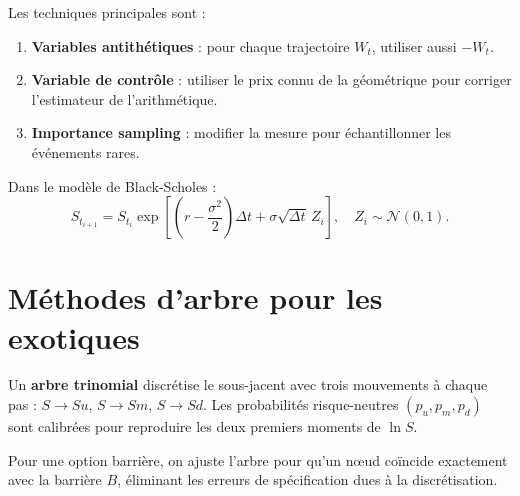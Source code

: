 \begin{proposition}
Les techniques principales sont :
\begin{enumerate}
    \item \textbf{Variables antith\'etiques} : pour chaque trajectoire
    $W_t$, utiliser aussi $-W_t$.
    \item \textbf{Variable de contr\^ole} : utiliser le prix connu de la
    g\'eom\'etrique pour corriger l'estimateur de l'arithm\'etique.
    \item \textbf{Importance sampling} : modifier la mesure pour \'echantillonner
    les \'ev\'enements rares.
\end{enumerate}
\end{proposition}

\begin{formules}[title=\textbf{Simulation de trajectoires sous $\Q$}]
Dans le mod\`ele de Black-Scholes :
\[
    S_{t_{i+1}} = S_{t_i}\exp\!\left[\left(r - \frac{\sigma^2}{2}\right)\Delta t
    + \sigma\sqrt{\Delta t}\,Z_i\right], \quad Z_i \sim \mathcal{N}(0, 1).
\]
\end{formules}

\section{M\'ethodes d'arbre pour les exotiques}

\begin{definition}
Un \textbf{arbre trinomial} discr\'etise le sous-jacent avec trois mouvements
\`a chaque pas : $S \to Su$, $S \to Sm$, $S \to Sd$. Les probabilit\'es
risque-neutres $(p_u, p_m, p_d)$ sont calibr\'ees pour reproduire les deux
premiers moments de $\ln S$.
\end{definition}

\begin{proposition}
Pour une option barri\`ere, on ajuste l'arbre pour qu'un n\oe ud co\"incide
exactement avec la barri\`ere $B$, \'eliminant les erreurs de sp\'ecification
dues \`a la discr\'etisation.
\end{proposition}

